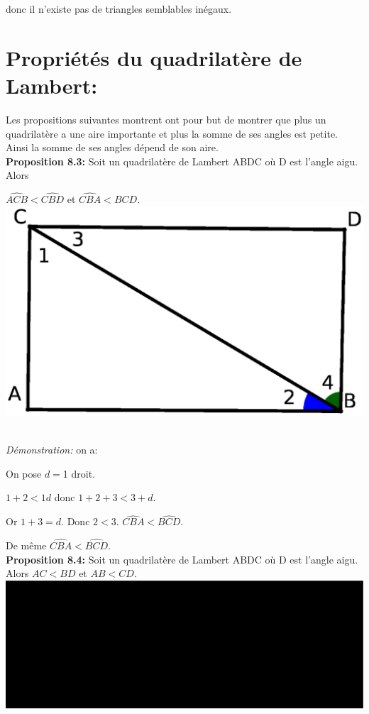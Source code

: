 \documentclass[a4paper, 12pt, twoside]{book}
\begin{document}
    donc il n'existe pas de triangles semblables inégaux.
 
   \section{Propriétés du quadrilatère de Lambert:}
 
 Les propositions suivantes montrent ont pour but de montrer que plus un quadrilatère a une aire importante et plus la somme de ses angles est petite. Ainsi la somme de ses angles dépend de son aire.\\
 
 
 \textbf{Proposition 8.3:} Soit un quadrilatère de Lambert ABDC où D est l'angle aigu. Alors\
 
   $ \hat{ACB}< \hat{CBD}$ et $\hat{CBA}< \hat{BCD}$.\\
   
    \includegraphics[scale=0.53]{figures/Lambert1.eps} \
    
   \textit{Démonstration:} on a:\
   
   On pose $d=$1 droit.\
   
   $ 1+2<1d$   donc $ 1+2+3 <3+d$.\
   
   Or $ 1+3=d$. Donc $2<3$. $\hat{CBA}< \hat{BCD}$.\
   
   De même $\hat{CBA}< \hat{BCD}$.\\
   
 
  \textbf{Proposition 8.4:} Soit un quadrilatère de Lambert ABDC où D est l'angle aigu. Alors $AC<BD$ et $AB<CD$.\\
 
 
 
   \includegraphics[scale=0.5]{figures/Lambert3.eps} \\
   
\end{document}
